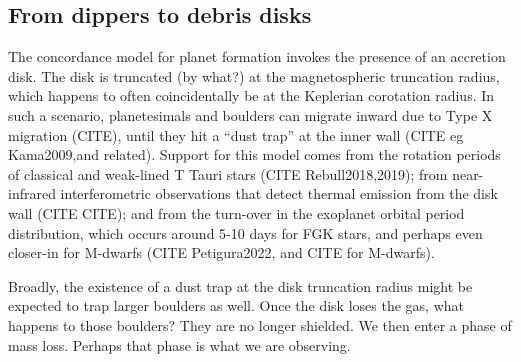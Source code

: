\documentclass[11pt,twocolumn,tighten]{aastex63}
\begin{document}





\subsection{From dippers to debris disks}
The concordance model for planet formation invokes the presence of an
accretion disk.  The disk is truncated (by what?) at the
magnetospheric truncation radius, which happens to often
coincidentally be at the Keplerian corotation radius.  In such a
scenario, planetesimals and boulders can migrate inward due to Type X
migration (CITE), until they hit a ``dust trap'' at the inner wall
(CITE eg Kama2009,and related).  Support for this model comes from the
rotation periods of classical and weak-lined T Tauri stars (CITE
Rebull2018,2019); from near-infrared interferometric observations that
detect thermal emission from the disk wall (CITE CITE); and from the
turn-over in the exoplanet orbital period distribution, which occurs
around 5-10 days for FGK stars, and perhaps even closer-in for
M-dwarfs (CITE Petigura2022, and CITE for M-dwarfs).

Broadly, the existence of a dust trap at the disk truncation radius
might be expected to trap larger boulders as well.  Once the disk
loses the gas, what happens to those boulders?  They are no longer
shielded.  We then enter a phase of mass loss.  Perhaps that phase is
what we are observing.
\end{document}
